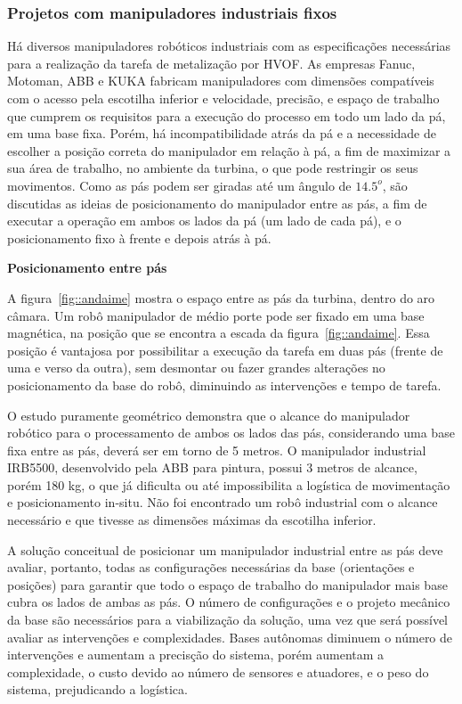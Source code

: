 \subsubsection{Projetos com manipuladores industriais fixos}\label{proj_manip}
Há diversos manipuladores robóticos industriais com as especificações
necessárias para a realização da tarefa de metalização por HVOF. As empresas
Fanuc, Motoman, ABB e KUKA fabricam manipuladores com dimensões compatíveis com o
acesso pela escotilha inferior e velocidade, precisão, e espaço de trabalho que
cumprem os requisitos para a execução do processo em todo um lado da pá, em uma
base fixa. Porém, há incompatibilidade atrás da pá e a necessidade de escolher a
posição correta do manipulador em relação à pá, a fim de maximizar a sua área de trabalho, no ambiente da
turbina, o que pode restringir os seus movimentos.
Como as pás podem ser giradas até um ângulo de $14.5^o$, são discutidas as ideias de posicionamento
do manipulador entre as pás, a fim de executar a operação em ambos os lados da
pá (um lado de cada pá), e o posicionamento fixo à frente e depois atrás à pá.

\textbf{Posicionamento entre pás}

A figura~\ref{fig::andaime} mostra o espaço entre as pás da turbina, dentro do
aro câmara. Um robô manipulador de médio porte pode ser fixado em uma base
magnética, na posição que se encontra a escada da figura~\ref{fig::andaime}.
Essa posição é vantajosa por possibilitar a execução da tarefa em duas pás
(frente de uma e verso da outra), sem desmontar ou fazer grandes alterações no
posicionamento da base do robô, diminuindo as intervenções e tempo de tarefa.

O estudo puramente geométrico demonstra que o alcance do manipulador robótico
para o processamento de ambos os lados das pás, considerando uma base fixa entre
as pás, deverá ser em torno de 5 metros. O manipulador industrial IRB5500,
desenvolvido pela ABB para pintura, possui 3 metros de alcance, porém 180 kg, o que já dificulta ou até impossibilita a
logística de movimentação e posicionamento in-situ. Não foi encontrado um robô
industrial com o alcance necessário e que tivesse as dimensões máximas da
escotilha inferior. 

A solução conceitual de posicionar um manipulador industrial entre as pás deve
avaliar, portanto, todas as configurações necessárias da base (orientações e
posições) para garantir que todo o espaço de trabalho do manipulador mais base
cubra os lados de ambas as pás. O número de configurações e o projeto
mecânico da base são necessários para a viabilização da solução,
uma vez que será possível avaliar as intervenções e complexidades. Bases
autônomas diminuem o número de intervenções e aumentam a precisção do sistema,
porém aumentam a complexidade, o custo devido ao número de sensores e atuadores,
e o peso do sistema, prejudicando a logística.

